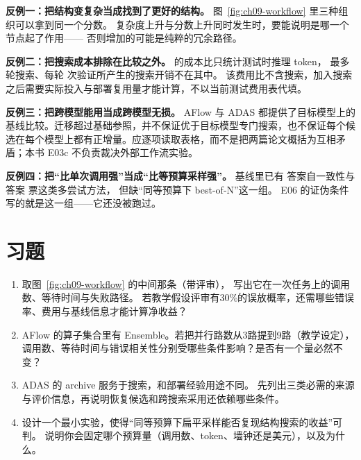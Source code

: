\begin{pitfallbox}
\textbf{反例一：把结构变复杂当成找到了更好的结构。}
图~\ref{fig:ch09-workflow} 里三种组织可以拿到同一个分数。
复杂度上升与分数上升同时发生时，要能说明是哪一个节点起了作用——
否则增加的可能是纯粹的冗余路径。

\textbf{反例二：把搜索成本排除在比较之外。}
 的成本比只统计测试时推理 token，
最多  轮搜索、每轮  次验证所产生的搜索开销不在其中\cite{aflow-2410}。
该费用比不含搜索，加入搜索之后需要实际投入与部署复用量才能计算，不以当前测试费用表代填。

\textbf{反例三：把跨模型能用当成跨模型无损。}
AFlow 与 ADAS 都提供了目标模型上的基线比较。迁移超过基础参照，并不保证优于目标模型专门搜索，也不保证每个候选在每个模型上都有正增量。应逐项读取表格，而不是把两篇论文概括为互相矛盾；本书 E03c 不负责裁决外部工作流实验。

\textbf{反例四：把``比单次调用强''当成``比等预算采样强''。}
基线里已有  答案自一致性与  答案  票这类多尝试方法\cite{aflow-2410}，
但缺``同等预算下 best-of-N''这一组\cite{aflow-2410}。
E06 的证伪条件写的就是这一组——它还没被跑过。
\end{pitfallbox}

\section*{习题}
\begin{enumerate}[label=9-\arabic*.,ref=9-\arabic*]
  \item\label{ex:ch09-1} 取图~\ref{fig:ch09-workflow} 的中间那条（带评审），
        写出它在一次任务上的调用数、等待时间与失败路径。
        若教学假设评审有30\%的误放概率，还需哪些错误率、费用与基线信息才能计算净收益？
  \item\label{ex:ch09-2} AFlow 的算子集合里有 Ensemble。若把并行路数从3路提到9路（教学设定），
        调用数、等待时间与错误相关性分别受哪些条件影响？是否有一个量必然不变？
  \item\label{ex:ch09-3} ADAS 的 archive 服务于搜索，和部署经验用途不同。
        先列出三类必需的来源与评价信息，再说明恢复候选和跨搜索采用还依赖哪些条件。
  \item\label{ex:ch09-4} 设计一个最小实验，使得``同等预算下扁平采样能否复现结构搜索的收益''可判。
        说明你会固定哪个预算量（调用数、token、墙钟还是美元），以及为什么。
\end{enumerate}

